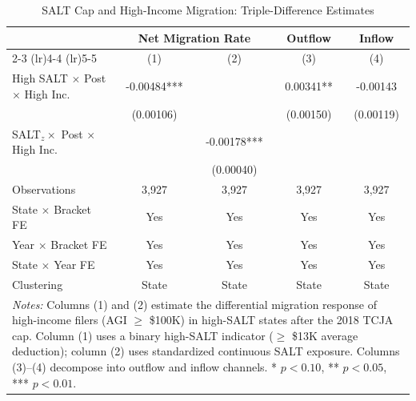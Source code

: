 \begin{table}[htbp]
\centering
\caption{SALT Cap and High-Income Migration: Triple-Difference Estimates}
\label{tab:triple}
\begin{tabular}{lcccc}
\toprule
 & \multicolumn{2}{c}{Net Migration Rate} & Outflow & Inflow \\
\cmidrule(lr){2-3} \cmidrule(lr){4-4} \cmidrule(lr){5-5}
 & (1) & (2) & (3) & (4) \\
\midrule
High SALT $\times$ Post $\times$ High Inc.\ & -0.00484*** & & 0.00341** & -0.00143 \\
 & (0.00106) & & (0.00150) & (0.00119) \\
[0.5em]
SALT$_z \times$ Post $\times$ High Inc.\ & & -0.00178*** & & \\
 & & (0.00040) & & \\
\midrule
Observations & 3,927 & 3,927 & 3,927 & 3,927 \\
State $\times$ Bracket FE & Yes & Yes & Yes & Yes \\
Year $\times$ Bracket FE & Yes & Yes & Yes & Yes \\
State $\times$ Year FE & Yes & Yes & Yes & Yes \\
Clustering & State & State & State & State \\
\bottomrule
\multicolumn{5}{p{0.95\textwidth}}{\footnotesize \textit{Notes:} Columns (1) and (2) estimate the differential migration response of high-income filers (AGI $\geq$ \$100K) in high-SALT states after the 2018 TCJA cap. Column (1) uses a binary high-SALT indicator ($\geq$ \$13K average deduction); column (2) uses standardized continuous SALT exposure. Columns (3)--(4) decompose into outflow and inflow channels. * $p<0.10$, ** $p<0.05$, *** $p<0.01$.} \\
\end{tabular}
\end{table}
